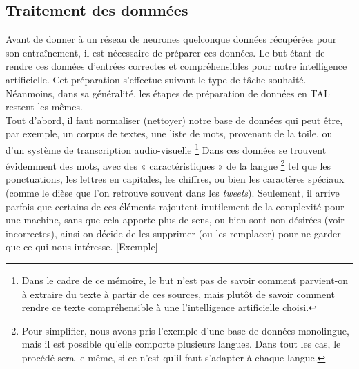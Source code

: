 \documentclass[12pt, french]{report}
\begin{document}
\subsection{Traitement des donnnées}

Avant de donner à un réseau de neurones quelconque données récupérées pour son entraînement, il est nécessaire de préparer ces données. Le but étant de rendre ces données d'entrées correctes et compréhensibles pour notre intelligence artificielle. Cet préparation s'effectue suivant le type de tâche souhaité. Néanmoins, dans sa généralité, les étapes de préparation de données en TAL restent les mêmes.\\

Tout d'abord, il faut normaliser (nettoyer) notre base de données qui peut être, par exemple, un corpus de textes, une liste de mots, provenant de la toile, ou d'un système de transcription audio-visuelle \footnote{Dans le cadre de ce mémoire, le but n'est pas de savoir comment parvient-on à extraire du texte à partir de ces sources, mais plutôt de savoir comment rendre ce texte compréhensible à une l'intelligence artificielle choisi.}
Dans ces données se trouvent évidemment des mots, avec des « caractéristiques » de la  langue \footnote{Pour simplifier, nous avons pris l'exemple d'une base de données  monolingue, mais il est possible qu'elle comporte plusieurs langues. Dans tout les cas, le procédé sera le même, si ce n'est qu'il faut s'adapter à chaque langue.} tel que les ponctuations, les lettres en capitales, les chiffres, ou bien les caractères spéciaux (comme le dièse que l'on retrouve souvent dans les \textit{tweets}). Seulement, il arrive parfois que certains de ces éléments rajoutent inutilement de la complexité pour une machine, sans que cela apporte plus de sens, ou bien sont non-désirées (voir incorrectes), ainsi on décide de les supprimer (ou les remplacer) pour ne garder que ce qui nous intéresse. [Exemple]\\
\end{document}
